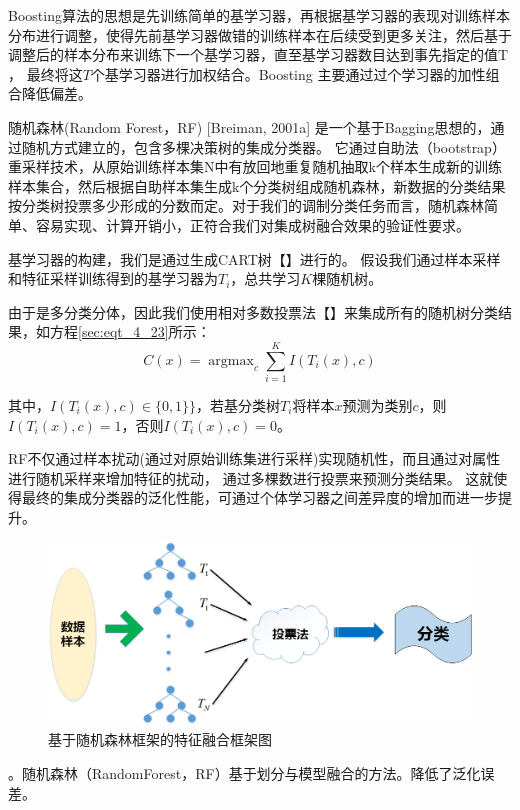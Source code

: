 Boosting算法的思想是先训练简单的基学习器，再根据基学习器的表现对训练样本分布进行调整，使得先前基学习器做错的训练样本在后续受到更多关注，然后基于调整后的样本分布来训练下一个基学习器，直至基学习器数目达到事先指定的值T ， 最终将这$T$个基学习器进行加权结合。Boosting 主要通过过个学习器的加性组合降低偏差。\par

随机森林(Random Forest，RF) [Breiman, 2001a] 是一个基于Bagging思想的，通过随机方式建立的，包含多棵决策树的集成分类器。
它通过自助法（bootstrap）重采样技术，从原始训练样本集N中有放回地重复随机抽取k个样本生成新的训练样本集合，然后根据自助样本集生成k个分类树组成随机森林，新数据的分类结果按分类树投票多少形成的分数而定。对于我们的调制分类任务而言，随机森林简单、容易实现、计算开销小，正符合我们对集成树融合效果的验证性要求。\par

基学习器的构建，我们是通过生成CART树【】进行的。
假设我们通过样本采样和特征采样训练得到的基学习器为$T_{i}$，总共学习$K$棵随机树。\par
由于是多分类分体，因此我们使用相对多数投票法【】来集成所有的随机树分类结果，如方程\ref{sec:eqt_4_23}所示：
\begin{equation}
	C(x) = \mathop{\arg\max}_{c} \sum_{i=1}^{K} I(T_i(x), c)
\end{equation}

其中，$I(T_i(x), c) \in \{0, 1\}\}$，若基分类树$T_{i}$将样本$x$预测为类别$c$，则$I(T_i(x), c)=1$，否则$I(T_i(x), c)=0$。\par

RF不仅通过样本扰动(通过对原始训练集进行采样)实现随机性，而且通过对属性进行随机采样来增加特征的扰动，
通过多棵数进行投票来预测分类结果。
这就使得最终的集成分类器的泛化性能，可通过个体学习器之间差异度的增加而进一步提升。\par


\begin{figure}[!h]
	\centering
	\includegraphics[scale=0.5]{figures/chapter_4/Tree_combine}
	\caption{基于随机森林框架的特征融合框架图}\label{sec:fig_4_4}
\end{figure}
。随机森林（RandomForest，RF）基于划分与模型融合的方法。降低了泛化误差。
